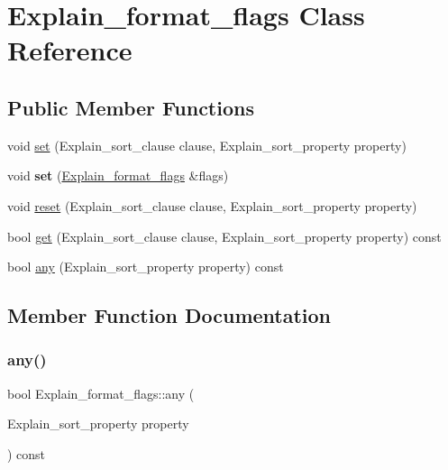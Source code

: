\hypertarget{classExplain__format__flags}{}\section{Explain\+\_\+format\+\_\+flags Class Reference}
\label{classExplain__format__flags}
\subsection*{Public Member Functions}
\begin{DoxyCompactItemize}
\item 
void \mbox{\hyperlink{classExplain__format__flags_afe772a223c5a9a59534f7e5a32a9367c}{set}} (Explain\+\_\+sort\+\_\+clause clause, Explain\+\_\+sort\+\_\+property property)
\item 
\mbox{\label{classExplain__format__flags_a15c5c894f868d516204933ca905e0355}} 
void {\bfseries set} (\mbox{\hyperlink{classExplain__format__flags}{Explain\+\_\+format\+\_\+flags}} \&flags)
\item 
void \mbox{\hyperlink{classExplain__format__flags_a9bf50161cba3d55f4fab126cacd7531d}{reset}} (Explain\+\_\+sort\+\_\+clause clause, Explain\+\_\+sort\+\_\+property property)
\item 
bool \mbox{\hyperlink{classExplain__format__flags_a02a34aa848f79ddca0b8c296e32379f6}{get}} (Explain\+\_\+sort\+\_\+clause clause, Explain\+\_\+sort\+\_\+property property) const
\item 
bool \mbox{\hyperlink{classExplain__format__flags_a9d220608d9f9f216f4af81f08b532c2c}{any}} (Explain\+\_\+sort\+\_\+property property) const
\end{DoxyCompactItemize}


\subsection{Member Function Documentation}
\mbox{\label{classExplain__format__flags_a9d220608d9f9f216f4af81f08b532c2c}} 
\subsubsection{\texorpdfstring{any()}{any()}}
{\footnotesize\ttfamily bool Explain\+\_\+format\+\_\+flags\+::any (\begin{DoxyParamCaption}\item[{Explain\+\_\+sort\+\_\+property}]{property }\end{DoxyParamCaption}) const\hspace{0.3cm}{\ttfamily [inline]}}

